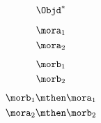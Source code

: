 {\begin{forslides}
        \begin{equation}
            \label{eq:hom-W-op}
            \Objd^\ast
        \end{equation}
        
        \begin{equation}
            \label{eq:f1}
            \mora_1
        \end{equation}
        \begin{equation}
            \label{eq:f2}
            \mora_2
        \end{equation}
        
        \begin{equation}
            \label{eq:g1}
            \morb_1
        \end{equation}
        \begin{equation}
            \label{eq:g2}
            \morb_2
        \end{equation}
        
        
        \begin{equation}
            \label{eq:g1f1}
            \morb_1\mthen \mora_1
        \end{equation}
        \begin{equation}
            \label{eq:f2g2}
            \mora_2\mthen \morb_2
        \end{equation}
    \end{forslides}
}
